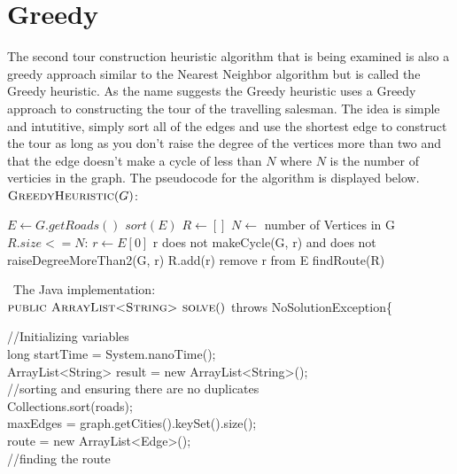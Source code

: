\documentclass[midd]{thesis}
\newcommand{\tab}{\hspace*{2em}}
\begin{document}
\section{Greedy}
\tab The second tour construction heuristic algorithm that is being examined is also a greedy approach similar to the Nearest Neighbor algorithm but is called the Greedy heuristic. As the name suggests the Greedy heuristic uses a Greedy approach to constructing the tour of the travelling salesman. The idea is simple and intutitive, simply sort all of the edges and use the shortest edge to construct the tour as long as you don't raise the degree of the vertices more than two and that the edge doesn't make a cycle of less than $N$ where $N$ is the number of verticies in the graph. The pseudocode for the algorithm is displayed below.\\
$\textnormal{\scshape GreedyHeuristic}(G)$:
\begin{codebox}
\li $E \gets G.getRoads()$
\li $sort(E)$
\li $R \gets []$
\li $N \gets$ number of Vertices in G
\li\While $R.size <= N$:
\li $r \gets E[0]$
\li \If r does not makeCycle(G, r) and does not raiseDegreeMoreThan2(G, r)
\li R.add(r) \End 
\li remove r from E \End
\li\Return findRoute(R)
\end{codebox}\
The Java implementation:\\
$\textnormal{\scshape public ArrayList<String> solve}()$ throws NoSolutionException\{
\begin{codebox}
\tab//Initializing variables\\
\tab long startTime = System.nanoTime();\\	
\tab ArrayList<String> result = new ArrayList<String>();\\
\tab//sorting and ensuring there are no duplicates\\
\tab Collections.sort(roads);\\
\tab maxEdges = graph.getCities().keySet().size();\\
\tab route = new ArrayList<Edge>();\\
\tab//finding the route\\
\end{codebox}
\end{document}
